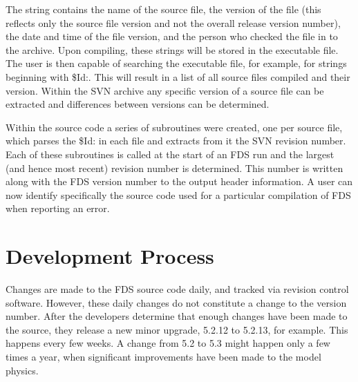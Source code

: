 \documentclass[11pt]{book}
\begin{document}
\noindent
The string contains the name of the source file, the version of the file (this reflects only the source
file version and not the overall release version number), the date and time of the file version, and
the person who checked the file in to the archive.  Upon compiling, these strings will be stored in the
executable file.  The user is then capable of searching the executable file, for example, for strings
beginning with {\ct \$Id:}.  This will result in a list of all source files compiled and their version.
Within the SVN archive any specific version of a source file can be extracted and differences between
versions can be determined.

Within the source code a series of subroutines were created, one per source file, which parses the {\ct \$Id:} in
each file and extracts from it the SVN revision number.  Each of these subroutines is called at the start
of an FDS run and the largest (and hence most recent) revision number is determined.  This number is written
along with the FDS version number to the output header information.  A user can now identify specifically
the source code used for a particular compilation of FDS when reporting an error.




\clearpage
\section{Development Process}

Changes are made to the FDS source code daily, and tracked via revision control software. However, these daily changes do not constitute a change to
the version number. After the developers determine that enough changes have been made to the source, they release a new minor upgrade, 5.2.12 to
5.2.13, for example. This happens every few weeks. A change from 5.2 to 5.3 might happen only a few times a year, when significant improvements have
been made to the model physics.
\end{document}
